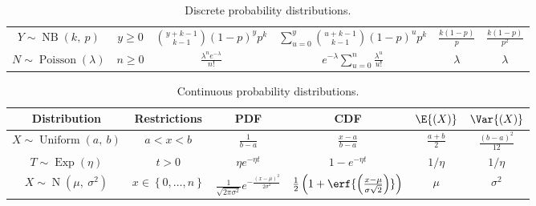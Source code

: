 \documentclass{article}
\begin{document}
\begin{table}[H]
\begin{tabular}{c c c c c c}
        \( Y \sim \operatorname{NB}{\left( k,\: p \right)}\)       & \(y \geq 0\)                                           & \(\binom{y + k - 1}{k - 1} \left( 1 - p \right)^y p^k\)   & \(\sum_{u = 0}^y \binom{u + k - 1}{k - 1} \left( 1 - p \right)^u p^k\)   & \(\frac{k\left( 1 - p \right)}{p}\) & \(\frac{k\left( 1 - p \right)}{p^2}\)         \\
        \( N \sim \operatorname{Poisson}{\left( \lambda \right)}\) & \(n \geq 0\)                                           & \(\frac{\lambda^n e^{-\lambda}}{n!}\)                     & \(e^{-\lambda} \sum_{u = 0}^n \frac{\lambda^u}{u!}\)                     & \(\lambda\)                         & \(\lambda\)                                   \\
        \bottomrule
    \end{tabular}
    \caption{Discrete probability distributions.} %
\end{table}
\begin{table}[H]
    \centering
    \begin{tabular}{c c c c c c}
        \toprule
        \textbf{Distribution}                                       & \textbf{Restrictions}                  & \textbf{PDF}                                                                         & \textbf{CDF}                                                                            & \(\E{\left( X \right)}\) & \(\Var{\left( X \right)}\)            \\
        \midrule
        \(X \sim \operatorname{Uniform}{\left( a,\: b \right)}\)    & \(a < x < b\)                          & \(\frac{1}{b - a}\)                                                                  & \(\frac{x - a}{b - a}\)                                                                 & \(\frac{a + b}{2}\)      & \(\frac{\left( b - a \right)^2}{12}\) \\
        \(T \sim \operatorname{Exp}{\left( \eta \right)}\)          & \(t > 0\)                              & \(\eta e^{-\eta t}\)                                                                 & \(1 - e^{-\eta t}\)                                                                     & \(1/\eta\)               & \(1/\eta\)                            \\
        \(X \sim \operatorname{N}{\left( \mu,\: \sigma^2 \right)}\) & \(x \in \left\{ 0, \dots, n \right\}\) & \(\frac{1}{\sqrt{2 \pi \sigma^2}} e^{-\frac{\left( x - \mu \right)^2}{2 \sigma^2}}\) & \(\frac{1}{2} \left( 1 + \erf{\left( \frac{x - \mu}{\sigma \sqrt{2}} \right)} \right)\) & \(\mu\)                  & \(\sigma^2\)                          \\
        \bottomrule
    \end{tabular}
    \caption{Continuous probability distributions.} %
\end{table}
\end{document}
